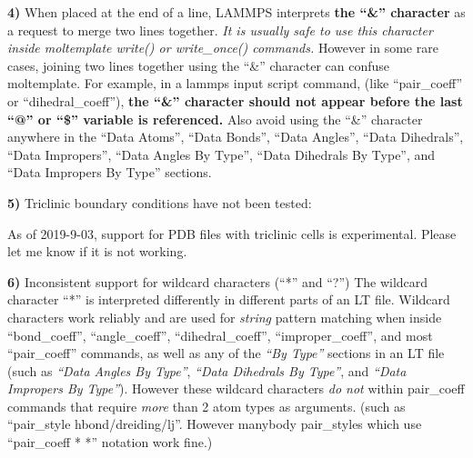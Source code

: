 \documentclass[11pt]{article}
\begin{document}
\textbf{4)} 
When placed at the end of a line, LAMMPS interprets 
\textbf{the ``\&'' character} as a 
request to merge two lines together.
\textit{It is usually safe to use this character inside
moltemplate write() or write\_once() commands.}
However in some rare cases, joining two lines together using 
the ``\&'' character can confuse moltemplate. 
For example, in a lammps input script command, 
(like ``pair\_coeff'' or ``dihedral\_coeff''), 
\textbf{the ``\&'' character should not appear before 
the last ``@'' or ``\$'' variable is referenced.}
Also avoid using the ``\&'' character anywhere in the 
``Data Atoms'', ``Data Bonds'', ``Data Angles'', ``Data Dihedrals'', ``Data Impropers'', ``Data Angles By Type'', ``Data Dihedrals By Type'', and ``Data Impropers By Type''
sections.

\textbf{5)} Triclinic boundary conditions have not been tested:

As of 2019-9-03, support for PDB files with triclinic cells is experimental.
Please let me know if it is not working.

\textbf{6)} Inconsistent support for wildcard characters (``*'' and ``?'') 
\label{sec:wildcard_bug}
   The wildcard character ``*''
   is interpreted differently in different parts of an LT file.
   Wildcard characters work reliably and are used for \textit{string}
   pattern matching when inside
   ``bond\_coeff'', ``angle\_coeff'', ``dihedral\_coeff'', ``improper\_coeff'',
   and most ``pair\_coeff'' commands,
   as well as any of the \textit{``By Type''} sections 
   in an LT file (such as
   \textit{``Data Angles By Type''}, 
   \textit{``Data Dihedrals By Type''}, and 
   \textit{``Data Impropers By Type''}).
   However these wildcard characters \textit{do not}
   within pair\_coeff commands that require \textit{more}
   than 2 atom types as arguments.
   (such as ``pair\_style hbond/dreiding/lj''.
    However manybody pair\_styles which use ``pair\_coeff * *''
    notation work fine.)

\end{document}
